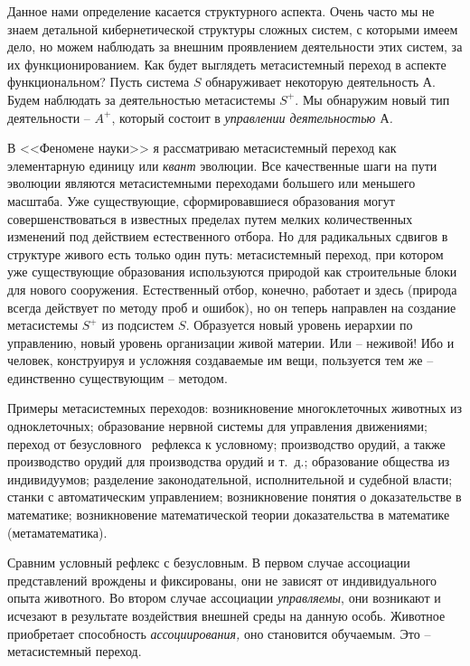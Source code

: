\documentclass{book}
\begin{document}
Данное нами определение касается структурного аспекта. Очень часто мы не знаем детальной кибернетической структу­ры сложных 
систем, с которыми имеем дело, но можем наблю­дать за внешним проявлением деятельности этих систем, за их функционированием. Как 
будет выглядеть метасистемный переход в аспекте функциональном? Пусть система $S$ обнару­живает некоторую деятельность $А$. Будем наблюдать за дея­тельностью метасистемы $S^{+}$. Мы обнаружим новый тип дея­тельности -- $A^{+}$, который состоит в \textit{управлении деятельно­стью $А$.}

В <<Феномене науки>> я рассматриваю метасистемный пере­ход как элементарную единицу или \textit{квант} эволюции. Все качественные шаги на пути эволюции являются метасистемными переходами большего или меньшего масштаба. Уже сущест­вующие, 
сформировавшиеся образования могут совершенство­ваться в известных пределах путем мелких количественных изменений под действием 
естественного отбора. Но для ради­кальных сдвигов в структуре живого есть только один путь: метасистемный переход, при котором 
уже существующие образования используются природой как строительные блоки для нового сооружения. Естественный отбор, конечно, 
работает и здесь (природа всегда действует по методу проб и ошибок), но он теперь направлен на создание метасистемы $S^{+}$ из 
подси­стем $S$. Образуется новый уровень иерархии по управлению, новый уровень организации живой материи. Или -- неживой! Ибо и 
человек, конструируя и усложняя создаваемые им вещи, пользуется тем же -- единственно существующим -- методом.

Примеры метасистемных переходов: возникновение много­клеточных животных из одноклеточных; образование нерв­ной системы для 
управления движениями; переход от безус­ловного  рефлекса к условному; производство орудий, а также производство орудий для 
производства орудий и т.~д.; образование общества из индивидуумов; разделение законо­дательной, исполнительной и судебной власти; 
станки с авто­матическим управлением; возникновение понятия о доказа­тельстве в математике; возникновение математической теории 
доказательства в математике (метаматематика).

Сравним условный рефлекс с безусловным. В первом случае ассоциации представлений врождены и фиксированы, они не зависят от 
индивидуального опыта животного. Во втором случае ассоциации \textit{управляемы}, они возникают и исчезают в результате воздействия внешней среды на данную особь. Животное приобретает способность \textit{ассоциирования,}  оно становит­ся обучаемым.
Это -- метасистемный переход.
\end{document}

